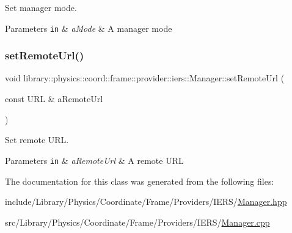 Set manager mode. 


\begin{DoxyParams}[1]{Parameters}
\mbox{\tt in}  & {\em a\+Mode} & A manager mode \\
\hline
\end{DoxyParams}
\mbox{\label{classlibrary_1_1physics_1_1coord_1_1frame_1_1provider_1_1iers_1_1_manager_ab764c676a7db8883d7896e129eac5605}} 
\subsubsection{\texorpdfstring{set\+Remote\+Url()}{setRemoteUrl()}}
{\footnotesize\ttfamily void library\+::physics\+::coord\+::frame\+::provider\+::iers\+::\+Manager\+::set\+Remote\+Url (\begin{DoxyParamCaption}\item[{const U\+RL \&}]{a\+Remote\+Url }\end{DoxyParamCaption})}



Set remote U\+RL. 


\begin{DoxyParams}[1]{Parameters}
\mbox{\tt in}  & {\em a\+Remote\+Url} & A remote U\+RL \\
\hline
\end{DoxyParams}


The documentation for this class was generated from the following files\+:\begin{DoxyCompactItemize}
\item 
include/\+Library/\+Physics/\+Coordinate/\+Frame/\+Providers/\+I\+E\+R\+S/\hyperlink{_coordinate_2_frame_2_providers_2_i_e_r_s_2_manager_8hpp}{Manager.\+hpp}\item 
src/\+Library/\+Physics/\+Coordinate/\+Frame/\+Providers/\+I\+E\+R\+S/\hyperlink{_coordinate_2_frame_2_providers_2_i_e_r_s_2_manager_8cpp}{Manager.\+cpp}\end{DoxyCompactItemize}
